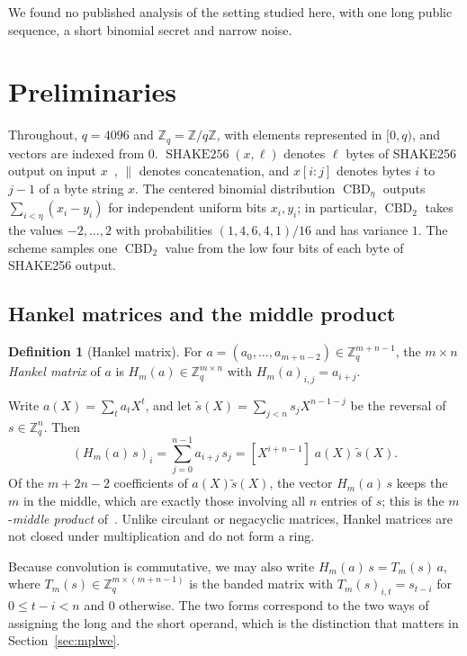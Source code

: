 \documentclass[11pt,a4paper]{article}
\theoremstyle{definition}
\newtheorem{definition}{Definition}
\newcommand{\Z}{\mathbb{Z}}
\newcommand{\Zq}{\mathbb{Z}_q}
\newcommand{\CBD}{\operatorname{CBD}}
\newcommand{\SHAKE}{\operatorname{SHAKE256}}
\begin{document}
We found no published analysis of the setting studied here, with one long public sequence, a short binomial secret and narrow noise.

\section{Preliminaries}\label{sec:prelim}

Throughout, $q = 4096$ and $\Zq = \Z/q\Z$, with elements represented in $[0, q)$, and vectors are indexed from $0$. $\SHAKE(x, \ell)$ denotes $\ell$ bytes of SHAKE256 output on input $x$~\cite{fips202}, $\|$ denotes concatenation, and $x[i{:}j]$ denotes bytes $i$ to $j - 1$ of a byte string $x$. The centered binomial distribution $\CBD_\eta$ outputs $\sum_{i<\eta} (x_i - y_i)$ for independent uniform bits $x_i, y_i$; in particular, $\CBD_2$ takes the values $-2, \dots, 2$ with probabilities $(1, 4, 6, 4, 1)/16$ and has variance $1$. The scheme samples one $\CBD_2$ value from the low four bits of each byte of SHAKE256 output.

\subsection{Hankel matrices and the middle product}
\begin{definition}[Hankel matrix]
For $a = (a_0, \dots, a_{m+n-2}) \in \Zq^{m+n-1}$, the $m \times n$ \emph{Hankel matrix} of $a$ is $H_m(a) \in \Zq^{m \times n}$ with $H_m(a)_{i,j} = a_{i+j}$.
\end{definition}

Write $a(X) = \sum_t a_t X^t$, and let $\tilde{s}(X) = \sum_{j<n} s_j X^{n-1-j}$ be the reversal of $s \in \Zq^n$. Then
\[
(H_m(a)\, s)_i = \sum_{j=0}^{n-1} a_{i+j}\, s_j = [X^{i+n-1}]\; a(X)\,\tilde{s}(X).
\]
Of the $m + 2n - 2$ coefficients of $a(X)\tilde{s}(X)$, the vector $H_m(a)\,s$ keeps the $m$ in the middle, which are exactly those involving all $n$ entries of $s$; this is the $m$-\emph{middle product} of~\cite{rsss2017middle}. Unlike circulant or negacyclic matrices, Hankel matrices are not closed under multiplication and do not form a ring.

Because convolution is commutative, we may also write $H_m(a)\,s = T_m(s)\,a$, where $T_m(s) \in \Zq^{m \times (m+n-1)}$ is the banded matrix with $T_m(s)_{i,t} = s_{t-i}$ for $0 \le t - i < n$ and $0$ otherwise. The two forms correspond to the two ways of assigning the long and the short operand, which is the distinction that matters in Section~\ref{sec:mplwe}.
\end{document}
